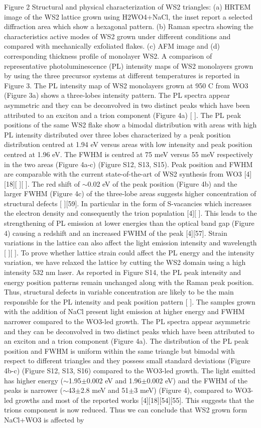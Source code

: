 \documentclass[12pt]{article}
\begin{document}
Figure 2 Structural and physical characterization of WS2 triangles: (a) HRTEM image of the WS2 lattice grown using H2WO4+NaCl, the inset report a selected diffraction area which show a hexagonal pattern. (b) Raman spectra showing the characteristics active modes of WS2 grown under different conditions and compared with mechanically exfoliated flakes. (c) AFM image and (d) corresponding thickness profile of monolayer WS2.
A comparison of representative photoluminescence (PL) intensity maps of WS2 monolayers grown by using the three precursor systems at different temperatures is reported in Figure 3. The PL intensity map of WS2 monolayers grown at 950 {\degree}C from WO3 (Figure 3a) shows a three-lobes intensity pattern. The PL spectra appear asymmetric and they can be deconvolved in two distinct peaks which have been attributed to an exciton and a trion component (Figure 4a) [ ]. The PL peak positions of the same WS2 flake show a bimodal distribution with areas with high PL intensity distributed over three lobes characterized by a peak position distribution centred at 1.94 eV versus areas with low intensity and peak position centred at 1.96 eV. The FWHM is centred at 75 meV versus 55 meV respectively in the two areas (Figure 4a-c) (Figure S12, S13, S15). Peak position and FWHM are comparable with the current state-of-the-art of WS2 synthesis from WO3 [4][18][ ][ ]. The red shift of {$\sim$}0.02 eV of the peak position (Figure 4b) and the larger FWHM (Figure 4c) of the three-lobe areas suggests higher concentration of structural defects [ ][59]. In particular in the form of S-vacancies which increases the electron density and consequently the trion population [4][ ]. This leads to the strengthening of PL emission at lower energies than the optical band gap (Figure 4) causing a redshift and an increased FWHM of the peak [4][57]. Strain variations in the lattice can also affect the light emission intensity and wavelength [ ][ ]. To prove whether lattice strain could affect the PL energy and the intensity variation, we have relaxed the lattice by cutting the WS2 domain using a high intensity 532 nm laser. As reported in Figure S14, the PL peak intensity and energy position patterns remain unchanged along with the Raman peak position. Thus, structural defects in variable concentration are likely to be the main responsible for the PL intensity and peak position pattern [ ]. The samples grown with the addition of NaCl present light emission at higher energy and FWHM narrower compared to the WO3-led growth. The PL spectra appear asymmetric and they can be deconvolved in two distinct peaks which have been attributed to an exciton and a trion component (Figure 4a). The distribution of the PL peak position and FWHM is uniform within the same triangle but bimodal with respect to different triangles and they possess small standard deviations (Figure 4b-c) (Figure S12, S13, S16) compared to the WO3-led growth. The light emitted has higher energy ({$\sim$}1.95{$\pm$}0.002 eV and 1.96{$\pm$}0.002 eV) and the FWHM of the peaks is narrower ({$\sim$}43{$\pm$}2.8 meV and 51{$\pm$}3 meV) (Figure 4), compared to WO3-led growths and most of the reported works [4][18][54][55]. This suggests that the trions component is now reduced. Thus we can conclude that WS2 grown form NaCl+WO3 is affected by 
\end{document}
